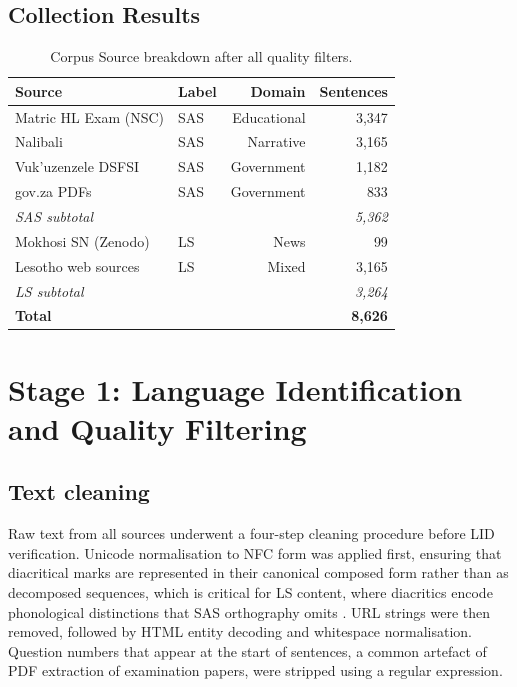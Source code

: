 \documentclass[11pt,a4paper]{article}
\begin{document}
\subsection{Collection Results}

\begin{table}[ht]
    \centering
    \label{tab:corpus_sources}
    \caption{Corpus Source breakdown after all quality filters.}
    \begin{tabular}{llrr}
     \toprule
    \textbf{Source} & \textbf{Label} & \textbf{Domain} & \textbf{Sentences} \\
    \midrule
    Matric HL Exam (NSC)   & SAS & Educational  & 3,347 \\
    Nalibali               & SAS & Narrative    & 3,165 \\
    Vuk'uzenzele DSFSI     & SAS & Government   & 1,182 \\
    gov.za PDFs            & SAS & Government   &   833 \\
    \midrule
    \textit{SAS subtotal}  &     &              & \textit{5,362} \\
    \midrule
    Mokhosi SN (Zenodo)    & LS  & News         &    99 \\
    Lesotho web sources    & LS  & Mixed        & 3,165 \\
    \midrule
    \textit{LS subtotal}   &     &              & \textit{3,264} \\
    \midrule
    \textbf{Total}         &     &              & \textbf{8,626} \\
    \bottomrule
    \end{tabular}
\end{table}



\section{Stage 1: Language Identification and Quality Filtering}

\subsection{Text cleaning}

Raw text from all sources underwent a four-step cleaning procedure before LID verification. Unicode normalisation to NFC form was applied first, ensuring that diacritical marks are represented in their canonical composed form rather than as decomposed sequences, which is critical for LS content, where diacritics encode phonological distinctions that SAS orthography omits \citep{matlosa2017sesotho}. URL strings were then removed, followed by HTML entity decoding and whitespace normalisation. Question numbers that appear at the start of sentences, a common artefact of PDF extraction of examination papers, were stripped using a regular expression.
\end{document}
